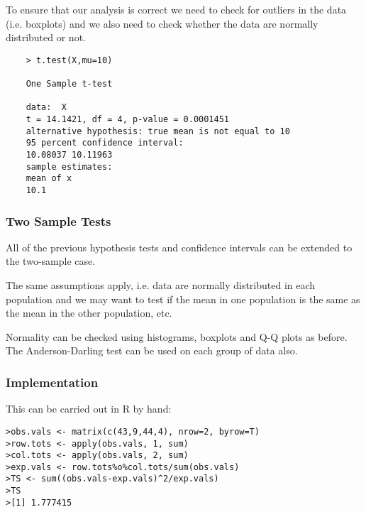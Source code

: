 To ensure that our analysis is correct we need to check for
outliers in the data (i.e. boxplots) and we also need to check
whether the data are normally distributed or not.

\begin{framed}
	\begin{verbatim}
	> t.test(X,mu=10)
	
	One Sample t-test
	
	data:  X 
	t = 14.1421, df = 4, p-value = 0.0001451
	alternative hypothesis: true mean is not equal to 10 
	95 percent confidence interval:
	10.08037 10.11963 
	sample estimates:
	mean of x 
	10.1 
	\end{verbatim}
\end{framed}








\subsubsection{Two Sample Tests}


All of the previous hypothesis tests and confidence intervals can be
extended to the two-sample case.

The same assumptions apply, i.e. data are normally distributed in
each population and we may want to test if the mean in one
population is the same as the mean in the other population, etc.

Normality can be checked using histograms, boxplots and Q-Q
plots as before. The Anderson-Darling test can be used on
each group of data also.


\subsubsection{Implementation}

This can be carried out in R by hand:

\footnotesize 
\begin{verbatim}
>obs.vals <- matrix(c(43,9,44,4), nrow=2, byrow=T)
>row.tots <- apply(obs.vals, 1, sum)
>col.tots <- apply(obs.vals, 2, sum)
>exp.vals <- row.tots%o%col.tots/sum(obs.vals)
>TS <- sum((obs.vals-exp.vals)^2/exp.vals)
>TS
>[1] 1.777415
\end{verbatim}
\normalsize







